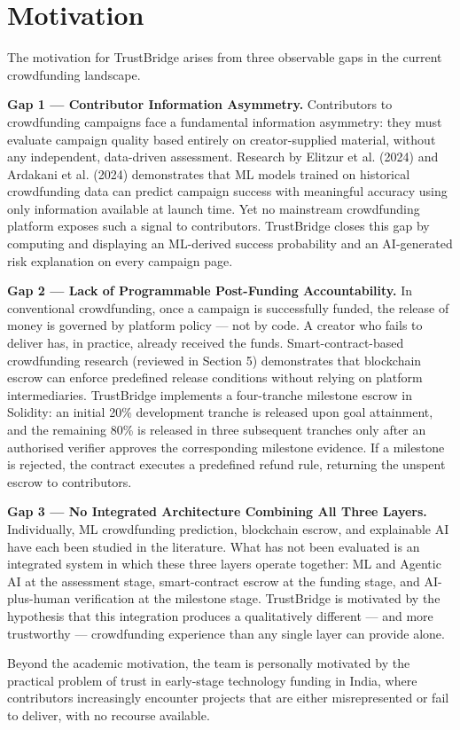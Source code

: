 \chapter{Motivation}

The motivation for TrustBridge arises from three observable gaps in the current crowdfunding landscape.

\textbf{Gap 1 — Contributor Information Asymmetry.} Contributors to crowdfunding campaigns face a fundamental information asymmetry: they must evaluate campaign quality based entirely on creator-supplied material, without any independent, data-driven assessment. Research by Elitzur et al. (2024) and Ardakani et al. (2024) demonstrates that ML models trained on historical crowdfunding data can predict campaign success with meaningful accuracy using only information available at launch time. Yet no mainstream crowdfunding platform exposes such a signal to contributors. TrustBridge closes this gap by computing and displaying an ML-derived success probability and an AI-generated risk explanation on every campaign page.

\textbf{Gap 2 — Lack of Programmable Post-Funding Accountability.} In conventional crowdfunding, once a campaign is successfully funded, the release of money is governed by platform policy — not by code. A creator who fails to deliver has, in practice, already received the funds. Smart-contract-based crowdfunding research (reviewed in Section 5) demonstrates that blockchain escrow can enforce predefined release conditions without relying on platform intermediaries. TrustBridge implements a four-tranche milestone escrow in Solidity: an initial 20\% development tranche is released upon goal attainment, and the remaining 80\% is released in three subsequent tranches only after an authorised verifier approves the corresponding milestone evidence. If a milestone is rejected, the contract executes a predefined refund rule, returning the unspent escrow to contributors.

\textbf{Gap 3 — No Integrated Architecture Combining All Three Layers.} Individually, ML crowdfunding prediction, blockchain escrow, and explainable AI have each been studied in the literature. What has not been evaluated is an integrated system in which these three layers operate together: ML and Agentic AI at the assessment stage, smart-contract escrow at the funding stage, and AI-plus-human verification at the milestone stage. TrustBridge is motivated by the hypothesis that this integration produces a qualitatively different — and more trustworthy — crowdfunding experience than any single layer can provide alone.

Beyond the academic motivation, the team is personally motivated by the practical problem of trust in early-stage technology funding in India, where contributors increasingly encounter projects that are either misrepresented or fail to deliver, with no recourse available.

